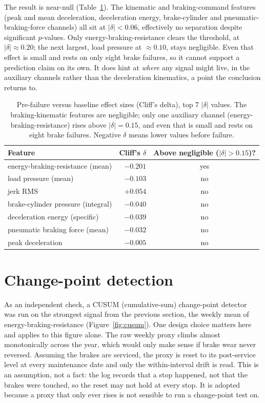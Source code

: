 The result is near-null (Table~\ref{tab:prefailure}). The kinematic and braking-command features
(peak and mean deceleration, deceleration energy, brake-cylinder and pneumatic-braking-force
channels) all sit at $|\delta| < 0.06$, effectively no separation despite significant $p$-values.
Only energy-braking-resistance clears the threshold, at $|\delta| \approx 0.20$; the next largest,
load pressure at $\approx 0.10$, stays negligible. Even that effect is small and rests on only
eight brake failures, so it cannot support a prediction claim on its own. It does hint at
\emph{where} any signal might live, in the auxiliary channels rather than the deceleration
kinematics, a point the conclusion returns to.

\begin{table}[htbp]
  \centering
  \caption{Pre-failure versus baseline effect sizes (Cliff's delta), top 7 $|\delta|$
  values. The braking-kinematic features are negligible; only one auxiliary channel
  (energy-braking-resistance) rises above $|\delta| = 0.15$, and even that is small and rests
  on eight brake failures. Negative $\delta$ means lower values before failure.}
  \label{tab:prefailure}
  \begin{tabular}{lrc}
    \toprule
    Feature & Cliff's $\delta$ & Above negligible ($|\delta|>0.15$)? \\
    \midrule
    energy-braking-resistance (mean)   & $-0.201$ & yes \\
    load pressure (mean)               & $-0.103$ & no  \\
    jerk RMS                           & $+0.054$ & no  \\
    brake-cylinder pressure (integral) & $-0.040$ & no  \\
    deceleration energy (specific)     & $-0.039$ & no  \\
    pneumatic braking force (mean)     & $-0.032$ & no  \\
    peak deceleration                  & $-0.005$ & no  \\
    \bottomrule
  \end{tabular}
\end{table}

\section{Change-point detection}
\label{sec:changepoint}

As an independent check, a CUSUM (cumulative-sum) change-point detector~\cite{Page:54} was run on the strongest
signal from the previous section, the weekly mean of energy-braking-resistance
(Figure~\ref{fig:cusum}). One design choice matters here and applies to this figure alone. The raw
weekly proxy climbs almost monotonically across the year, which would only make sense if brake wear
never reversed. Assuming the brakes are serviced, the proxy is reset to its post-service level at
every maintenance date and only the within-interval drift is read. This is an assumption, not a
fact: the log records that a stop happened, not that the brakes were touched, so the reset may not
hold at every stop. It is adopted because a proxy that only ever rises is not sensible to run a
change-point test on.

